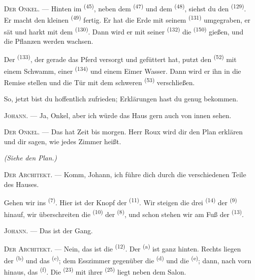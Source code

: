 \textsc{Der Onkel}. --- Hinten im  \textsuperscript{(45)}, neben dem
 \textsuperscript{(47)} und dem 
\textsuperscript{(48)}, siehst du den  \textsuperscript{(129)}. Er
macht den kleinen  \textsuperscript{(49)} fertig. Er hat die Erde mit
seinem  \textsuperscript{(131)} umgegraben, er sät und harkt mit dem
 \textsuperscript{(130)}. Dann wird er mit seiner
 \textsuperscript{(132)} die 
\textsuperscript{(150)} gießen, und die Pflanzen werden wachsen.

Der  \textsuperscript{(133)}, der gerade das Pferd versorgt und
gefüttert hat, putzt den  \textsuperscript{(52)} mit einem Schwamm,
einer  \textsuperscript{(134)} und einem Eimer Wasser. Dann wird er
ihn in die Remise stellen und die Tür mit dem schweren 
\textsuperscript{(53)} verschließen.

So, jetzt bist du hoffentlich zufrieden; Erklärungen hast du genug bekommen.

\textsc{Johann}. --- Ja, Onkel, aber ich würde das Haus gern auch von innen sehen.

\textsc{Der Onkel}. --- Das hat Zeit bis morgen. Herr Roux wird dir den Plan
erklären und dir sagen, wie jedes Zimmer heißt.

\VUsaut{3.0mm}
\VUsaut{2.4mm}

{\centering\textit{(Siehe den Plan.)}\par}
\VUsaut{2.4mm}

\textsc{Der Architekt}. --- Komm, Johann, ich führe dich durch die verschiedenen
Teile des Hauses.

Gehen wir ins  \textsuperscript{(7)}. Hier ist der Knopf der
 \textsuperscript{(11)}. Wir steigen die drei 
\textsuperscript{(14)} der  \textsuperscript{(9)} hinauf, wir
überschreiten die  \textsuperscript{(10)} der 
\textsuperscript{(8)}, und schon stehen wir am Fuß der 
\textsuperscript{(13)}.

\textsc{Johann}. --- Das ist der Gang.

\textsc{Der Architekt}. --- Nein, das ist die  \textsuperscript{(12)}.
Der  \textsuperscript{(a)} ist ganz hinten. Rechts liegen der
 \textsuperscript{(b)} und das 
\textsuperscript{(c)}; dem Esszimmer gegenüber die 
\textsuperscript{(d)} und die  \textsuperscript{(e)}; dann, nach
vorn hinaus, das  \textsuperscript{(f)}. Die
 \textsuperscript{(23)} mit ihrer 
\textsuperscript{(25)} liegt neben dem Salon.

